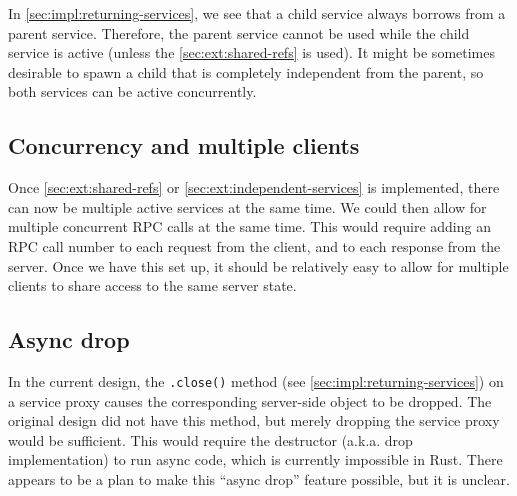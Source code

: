 \documentclass[11pt, twocolumn]{article}
\begin{document}
In \cref{sec:impl:returning-services}, we see that a child service always borrows from a parent service. Therefore, the parent service cannot be used while the child service is active (unless the \cref{sec:ext:shared-refs} is used). It might be sometimes desirable to spawn a child that is completely independent from the parent, so both services can be active concurrently.

\subsection{Concurrency and multiple clients} \label{sec:ext:concurrency}

Once \cref{sec:ext:shared-refs} or \cref{sec:ext:independent-services} is implemented, there can now be multiple active services at the same time. We could then allow for multiple concurrent RPC calls at the same time. This would require adding an RPC call number to each request from the client, and to each response from the server. Once we have this set up, it should be relatively easy to allow for multiple clients to share access to the same server state.

\subsection{Async drop} \label{sec:ext:async-drop}

In the current design, the \texttt{.close()} method (see \cref{sec:impl:returning-services}) on a service proxy causes the corresponding server-side object to be dropped. The original design did not have this method, but merely dropping the service proxy would be sufficient. This would require the destructor (a.k.a. drop implementation) to run async code, which is currently impossible in Rust. There appears to be a plan\cite{async-drop} to make this ``async drop'' feature possible, but it is unclear.

\printbibliography
\end{document}
